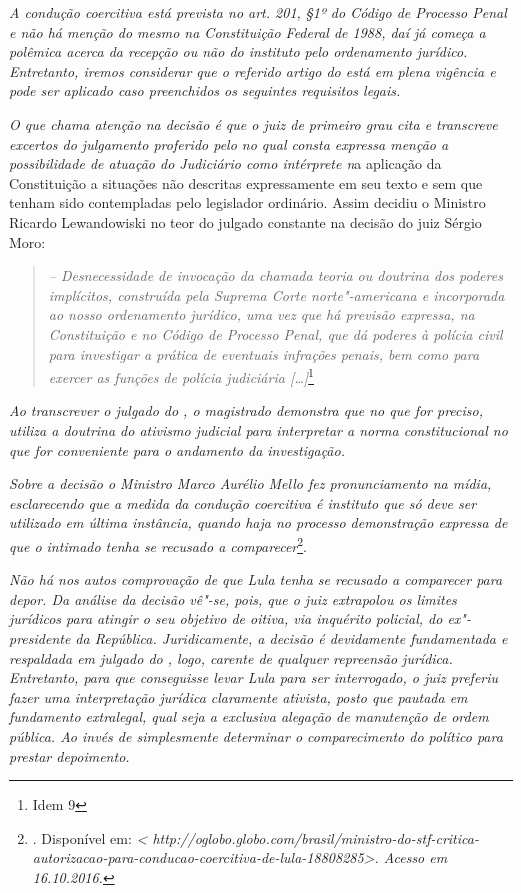 \emph{A condução coercitiva está prevista no art. 201, §1º do Código de
Processo Penal e não há menção do mesmo na Constituição Federal de 1988,
daí já começa a polêmica acerca da recepção ou não do instituto pelo
ordenamento jurídico. Entretanto, iremos considerar que o referido
artigo do  está em plena vigência e pode ser aplicado caso
preenchidos os seguintes requisitos legais. }

\emph{O que chama atenção na decisão é que o juiz de primeiro grau cita
e transcreve excertos do julgamento proferido pelo  no qual consta
expressa menção a possibilidade de atuação do Judiciário como intérprete
n}a aplicação da Constituição a situações não descritas expressamente em
seu texto e sem que tenham sido contempladas pelo legislador ordinário.
Assim decidiu o Ministro Ricardo Lewandowiski no teor do julgado
constante na decisão do juiz Sérgio Moro:

\begin{quote}
\emph{ -- Desnecessidade de invocação da chamada teoria ou doutrina
dos poderes implícitos, construída pela Suprema Corte norte"-americana e
incorporada ao nosso ordenamento jurídico, uma vez que há previsão
expressa, na Constituição e no Código de Processo Penal, que dá poderes
à polícia civil para investigar a prática de eventuais infrações penais,
bem como para exercer as funções de polícia judiciária
{[}\ldots{}{]}}\footnote{Idem 9}
\end{quote}

\emph{Ao transcrever o julgado do , o magistrado demonstra que no que
for preciso, utiliza a doutrina do ativismo judicial para interpretar a
norma constitucional no que for conveniente para o andamento da
investigação. }

\emph{Sobre a decisão o Ministro Marco Aurélio Mello fez pronunciamento
na mídia, esclarecendo que a medida da condução coercitiva é instituto
que só deve ser utilizado em última instância, quando haja no processo
demonstração expressa de que o intimado tenha se recusado a
comparecer}\footnote{. Disponível em: \emph{\textless{}
 http://oglobo.globo.com/brasil/ministro-do-stf-critica-autorizacao-para-conducao-coercitiva-de-lula-18808285\textgreater{}.
  Acesso em 16.10.2016.}}.

\emph{Não há nos autos comprovação de que Lula tenha se recusado a
comparecer para depor. Da análise da decisão vê"-se, pois, que o juiz
extrapolou os limites jurídicos para atingir o seu objetivo de oitiva,
via inquérito policial, do ex"-presidente da República. Juridicamente, a
decisão é devidamente fundamentada e respaldada em julgado do , logo,
carente de qualquer repreensão jurídica. Entretanto, para que
conseguisse levar Lula para ser interrogado, o juiz preferiu fazer uma
interpretação jurídica claramente ativista, posto que pautada em
fundamento extralegal, qual seja a exclusiva alegação de manutenção de
ordem pública. Ao invés de simplesmente determinar o comparecimento do
político para prestar depoimento. }

